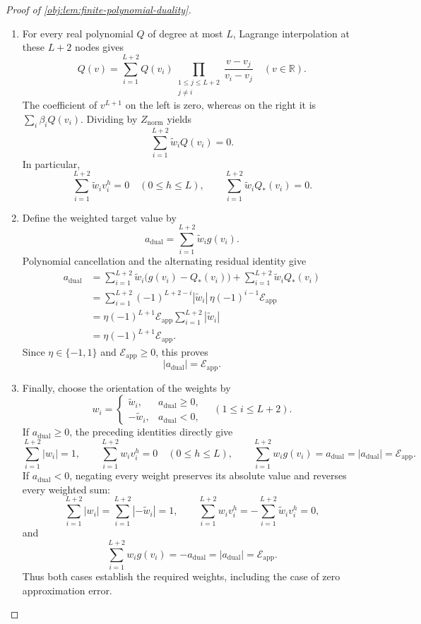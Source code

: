 \documentclass[11pt]{article}
\begin{document}
\begin{proof}[Proof of \cref{obj:lem:finite-polynomial-duality}]
\begin{enumerate}
\item For every real polynomial \(Q\) of degree at most \(L\), Lagrange interpolation at these \(L+2\) nodes gives
\[
Q(v)
=
\sum_{i=1}^{L+2}
Q(v_i)
\prod_{\substack{1\le j\le L+2\\j\ne i}}
\frac{v-v_j}{v_i-v_j}
\quad(v\in\mathbb R).
\]
The coefficient of \(v^{L+1}\) on the left is zero, whereas on the right it is \(\sum_i\beta_iQ(v_i)\). Dividing by \(Z_{\mathrm{norm}}\) yields
\[
\sum_{i=1}^{L+2}\widetilde w_iQ(v_i)=0.
\]
In particular,
\[
\sum_{i=1}^{L+2}\widetilde w_i v_i^h=0
\quad(0\le h\le L),
\qquad
\sum_{i=1}^{L+2}\widetilde w_iQ_*(v_i)=0.
\]

\item Define the weighted target value by
\[
a_{\mathrm{dual}}
=
\sum_{i=1}^{L+2}\widetilde w_i g(v_i).
\]
Polynomial cancellation and the alternating residual identity give
\[
\begin{aligned}
a_{\mathrm{dual}}
&=
\sum_{i=1}^{L+2}\widetilde w_i\bigl(g(v_i)-Q_*(v_i)\bigr)
+\sum_{i=1}^{L+2}\widetilde w_iQ_*(v_i)\\
&=
\sum_{i=1}^{L+2}
(-1)^{L+2-i}|\widetilde w_i|\,
\eta(-1)^{i-1}\mathcal E_{\mathrm{app}}\\
&=
\eta(-1)^{L+1}\mathcal E_{\mathrm{app}}
\sum_{i=1}^{L+2}|\widetilde w_i|\\
&=\eta(-1)^{L+1}\mathcal E_{\mathrm{app}}.
\end{aligned}
\]
Since \(\eta\in\{-1,1\}\) and \(\mathcal E_{\mathrm{app}}\ge0\), this proves
\[
|a_{\mathrm{dual}}|=\mathcal E_{\mathrm{app}}.
\]

\item Finally, choose the orientation of the weights by
\[
w_i=
\begin{cases}
\widetilde w_i,&a_{\mathrm{dual}}\ge0,\\
-\widetilde w_i,&a_{\mathrm{dual}}<0,
\end{cases}
\quad(1\le i\le L+2).
\]
If \(a_{\mathrm{dual}}\ge0\), the preceding identities directly give
\[
\sum_{i=1}^{L+2}|w_i|=1,
\qquad
\sum_{i=1}^{L+2}w_iv_i^h=0
\quad(0\le h\le L),
\qquad
\sum_{i=1}^{L+2}w_ig(v_i)
=a_{\mathrm{dual}}
=|a_{\mathrm{dual}}|
=\mathcal E_{\mathrm{app}}.
\]
If \(a_{\mathrm{dual}}<0\), negating every weight preserves its absolute value and reverses every weighted sum:
\[
\sum_{i=1}^{L+2}|w_i|
=\sum_{i=1}^{L+2}|-\widetilde w_i|=1,
\qquad
\sum_{i=1}^{L+2}w_iv_i^h
=-\sum_{i=1}^{L+2}\widetilde w_iv_i^h=0,
\]
and
\[
\sum_{i=1}^{L+2}w_ig(v_i)
=-a_{\mathrm{dual}}
=|a_{\mathrm{dual}}|
=\mathcal E_{\mathrm{app}}.
\]
Thus both cases establish the required weights, including the case of zero approximation error.


\end{enumerate}
\end{proof}
\end{document}

